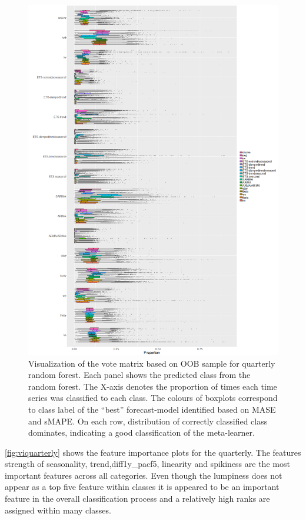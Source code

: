 \documentclass[11pt,a4paper,]{article}
\begin{document}
\begin{figure}
\centering
\includegraphics{figures/oobquarterly-1.png}
\caption{\label{fig:oobquarterly}Visualization of the vote matrix based on
OOB sample for quarterly random forest. Each panel shows the predicted
class from the random forest. The X-axis denotes the proportion of times
each time series was classified to each class. The colours of boxplots
correspond to class label of the ``best'' forecast-model identified
based on MASE and sMAPE. On each row, distribution of correctly
classified class dominates, indicating a good classification of the
meta-learner.}
\end{figure}

\autoref{fig:viquarterly} shows the feature importance plots for the
quarterly. The features strength of seasonality, trend,diff1y\_pacf5,
linearity and spikiness are the most important features across all
categories. Even though the lumpiness does not appear as a top five
feature within classes it is appeared to be an important feature in the
overall classification process and a relatively high ranks are assigned
within many classes.
\end{document}
